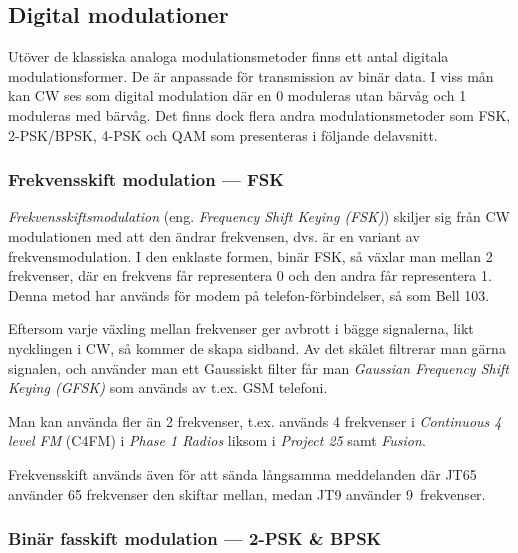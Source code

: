 \subsection{Digital modulationer}

Utöver de klassiska analoga modulationsmetoder finns ett antal digitala
modulationsformer.
De är anpassade för transmission av binär data.
I viss mån kan CW ses som digital modulation där en 0 moduleras utan bärvåg
och 1 moduleras med bärvåg.
Det finns dock flera andra modulationsmetoder som FSK, 2-PSK/BPSK, 4-PSK och
QAM som presenteras i följande delavsnitt.

\subsubsection{Frekvensskift modulation --- FSK}

\emph{Frekvensskiftsmodulation} (eng. \emph{Frequency Shift Keying (FSK)})
skiljer sig från CW modulationen med att den ändrar frekvensen, dvs. är en
variant av frekvensmodulation. I den enklaste formen, binär FSK, så växlar man
mellan 2 frekvenser, där en frekvens får representera 0 och den andra får
representera 1. Denna metod har används för modem på telefon-förbindelser,
så som Bell 103.

Eftersom varje växling mellan frekvenser ger avbrott i bägge signalerna,
likt nycklingen i CW, så kommer de skapa sidband. Av det skälet filtrerar man
gärna signalen, och använder man ett Gaussiskt filter får man
\emph{Gaussian Frequency Shift Keying (GFSK)} som används av t.ex. GSM telefoni.

Man kan använda fler än 2 frekvenser, t.ex. används 4 frekvenser i \emph{Continuous
4 level FM} (C4FM) i \emph{Phase 1 Radios} liksom i \emph{Project 25} samt \emph{Fusion}.

Frekvensskift används även för att sända långsamma meddelanden där JT65
använder 65 frekvenser den skiftar mellan, medan JT9 använder 9~frekvenser.

\subsubsection{Binär fasskift modulation --- 2-PSK \& BPSK}

